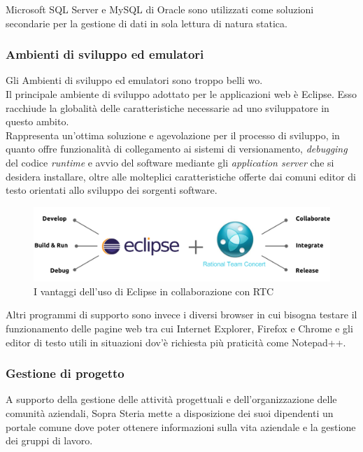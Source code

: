 	
	Microsoft SQL Server e MySQL di Oracle sono utilizzati come soluzioni secondarie per la gestione di dati in sola lettura di natura statica.
		
	\subsubsection{Ambienti di sviluppo ed emulatori}
	Gli Ambienti di sviluppo ed emulatori sono troppo belli \tab wo.\\
	Il principale ambiente di sviluppo adottato per le applicazioni web è Eclipse. Esso racchiude la globalità delle caratteristiche necessarie ad uno sviluppatore in questo ambito.\\	
	
	Rappresenta un'ottima soluzione e agevolazione per il processo di sviluppo, in quanto offre funzionalità di collegamento ai sistemi di versionamento, \textit{debugging} del codice \textit{runtime} e avvio del software mediante gli \textit{application server} che si desidera installare, oltre alle molteplici caratteristiche offerte dai comuni editor di testo orientati allo sviluppo dei sorgenti software.
	
	\begin{figure}[H]
		\centering
	   	\includegraphics[width=1\textwidth]{immagini/ambienti_sviluppo}
	   	\caption{I vantaggi dell'uso di Eclipse in collaborazione con RTC}
	\end{figure}
	
	Altri programmi di supporto sono invece i diversi browser in cui bisogna testare il funzionamento delle pagine web tra cui Internet Explorer, Firefox e Chrome e gli editor di testo utili in situazioni dov'è richiesta più praticità come Notepad++.

	\subsubsection{Gestione di progetto}
	A supporto della gestione delle attività progettuali e dell'organizzazione delle comunità aziendali, Sopra Steria mette a disposizione dei suoi dipendenti un portale comune dove poter ottenere informazioni sulla vita aziendale e la gestione dei gruppi di lavoro. \\
	
